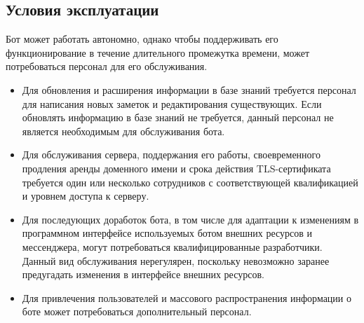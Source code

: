\subsection{Условия эксплуатации}
\label{sec:req:maint}
Бот может работать автономно, однако чтобы поддерживать его функционирование в течение
длительного промежутка времени, может потребоваться персонал для его обслуживания.

\begin{itemize}
    \item
        Для обновления и расширения информации в базе знаний требуется персонал для
        написания новых заметок и редактирования существующих. Если обновлять информацию
        в базе знаний не требуется, данный персонал не является необходимым для обслуживания бота.
    \item
        Для обслуживания сервера, поддержания его работы, своевременного продления аренды доменного имени
        и срока действия TLS-сертификата требуется один или несколько сотрудников с соответствующей
        квалификацией и уровнем доступа к серверу.
    \item
        Для последующих доработок бота, в том числе для адаптации к изменениям в программном интерфейсе
        используемых ботом внешних ресурсов и мессенджера, могут потребоваться квалифицированные
        разработчики. Данный вид обслуживания нерегулярен, поскольку невозможно заранее предугадать
        изменения в интерфейсе внешних ресурсов.
    \item
        Для привлечения пользователей и массового распространения информации о боте может
        потребоваться дополнительный персонал.
\end{itemize}
